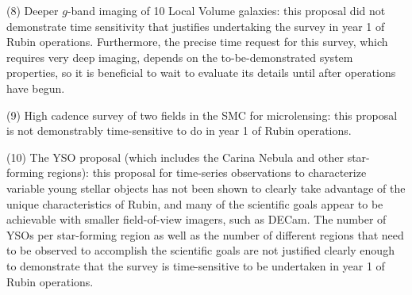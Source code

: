(8) Deeper $g$-band imaging of 10 Local Volume galaxies: this proposal did not demonstrate time sensitivity that justifies undertaking the survey in year 1 of Rubin operations. Furthermore, the precise time request for this survey, which requires very deep imaging, depends on the to-be-demonstrated system properties, so it is beneficial to wait to evaluate its details until 
after operations have begun. 

(9) High cadence survey of two fields in the SMC for microlensing: this proposal is not demonstrably time-sensitive to do in year 1 of Rubin operations. 

(10) The YSO proposal (which includes the Carina Nebula and other star-forming regions): this proposal for time-series observations to characterize variable young stellar objects has not been shown to clearly take advantage of the unique characteristics of Rubin, and many of the scientific goals appear to be achievable with smaller field-of-view imagers, such as DECam. The number of YSOs per star-forming region as well as the number of different regions that need to be observed to accomplish the scientific goals are not justified clearly enough to demonstrate that the survey is time-sensitive to be undertaken in year 1 of Rubin operations.
